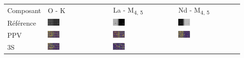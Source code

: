 \begin{tabular}{m{}*{3}{M{0.21\textwidth}}}
Composant&O - K&La - M\textsubscript{4, 5}&Nd - M\textsubscript{4, 5}\\
Référence
&\includegraphics[width=0.2\textwidth]{img/chapitre4/figure15/synth_hole/SynthH_GT_band_0.png}
&\includegraphics[width=0.2\textwidth]{img/chapitre4/figure15/synth_hole/SynthH_GT_band_1.png}
&\includegraphics[width=0.2\textwidth]{img/chapitre4/figure15/synth_hole/SynthH_GT_band_2.png}
\\
PPV
&\includegraphics[width=0.2\textwidth]{img/chapitre4/figure15/synth_hole/SynthH_interpolation_band_0.png}
&\includegraphics[width=0.2\textwidth]{img/chapitre4/figure15/synth_hole/SynthH_interpolation_band_1.png}
&\includegraphics[width=0.2\textwidth]{img/chapitre4/figure15/synth_hole/SynthH_interpolation_band_2.png}
\\
3S
&\includegraphics[width=0.2\textwidth]{img/chapitre4/figure15/synth_hole/SynthH_3S_band_0.png}
&\includegraphics[width=0.2\textwidth]{img/chapitre4/figure15/synth_hole/SynthH_3S_band_1.png}

\end{tabular}
